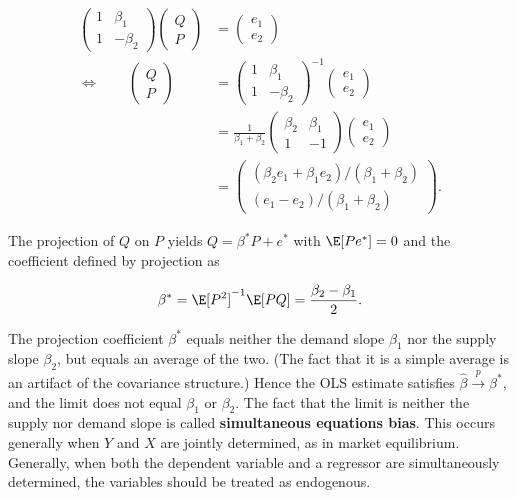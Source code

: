 \begin{itemize}
\begin{align*}
\begin{pmatrix}
1 & \beta_1 \\
1 & - \beta_2
\end{pmatrix}\begin{pmatrix}
Q \\
P \end{pmatrix}
& = \begin{pmatrix}
e_1 \\
e_2 \end{pmatrix}
\\ \iff \qquad  \begin{pmatrix}
Q \\
P \end{pmatrix} & = \begin{pmatrix}
1 & \beta_1 \\
1 & - \beta_2
\end{pmatrix}^{-1}  \begin{pmatrix}
e_1 \\
e_2 \end{pmatrix}
\\  & = \frac{1}{\beta_1 + \beta_2} \begin{pmatrix}
\beta_2 & \beta_1 \\
1 & -1
\end{pmatrix}  \begin{pmatrix}
e_1 \\
e_2 \end{pmatrix}
\\  & = \begin{pmatrix}
(\beta_2e_1 + \beta_1 e_2)/(\beta_1 + \beta_2) \\
(e_1 - e_2)/(\beta_1 + \beta_2) \end{pmatrix}.
\end{align*}

The projection of \(Q\) on \(P\) yields \(Q = \beta^* P + e^*\) with \(\E[P e^*] = 0\) and the coefficient defined by projection as 

\[
\beta^* = \E[ P^2]^{-1} \E[PQ] = \frac{\beta_2 - \beta_1}{2}.
\]

The projection coefficient \(\beta^*\) equals neither the demand slope \(\beta_1\) nor the supply slope \(\beta_2\), but equals an average of the two. (The fact that it is a simple average is an artifact of the covariance structure.) Hence the OLS estimate satisfies \(\hat{\beta} \xrightarrow{p} \beta^*\), and the limit does not equal \(\beta_1\) or \(\beta_2\). The fact that the limit is neither the supply nor demand slope is called \textbf{simultaneous equations bias}. This occurs generally when \(Y\) and \(X\) are jointly determined, as in market equilibrium. Generally, when both the dependent variable and a regressor are simultaneously determined, the variables should be treated as endogenous.


\end{itemize}
